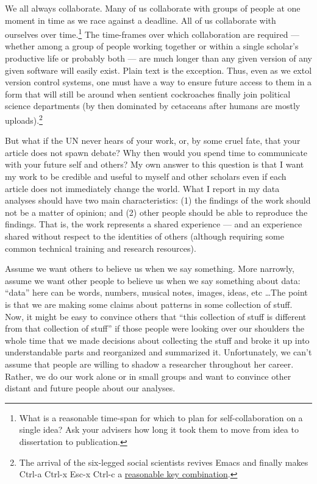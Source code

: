\documentclass[12pt]{article}
\begin{document}
We all always collaborate. Many of us collaborate with groups of
people at one moment in time as we race against a deadline. All of us
collaborate with ourselves over time.\footnote{What is a reasonable
  time-span for which to plan for self-collaboration on a single idea?
  Ask your advisers how long it took them to move from idea to dissertation to
  publication.}  The time-frames over which collaboration are required
--- whether among a group of people working together or within a
single scholar's productive life or probably both --- are much longer
than any given version of any given software will easily exist. Plain
text is the exception. Thus, even as we extol version control systems,
one must have a way to ensure future access to them in a form that
will still be around when sentient cockroaches finally join political
science departments (by then dominated by cetaceans after humans are
mostly uploads).\footnote{The arrival of the six-legged social
  scientists revives Emacs and finally makes Ctrl-a Ctrl-x Esc-x
  Ctrl-c a \href{http://kieran.healy.usesthis.com/}{reasonable key
    combination}.}

But what if the UN never hears of your work, or, by some cruel fate, that your
article does not spawn debate? Why then would you spend time to
communicate with your future self and others? My own answer to this
question is that I want my work to be credible and useful to myself
and other scholars even if each article does not immediately change
the world.  What I report in my data analyses should have two main
characteristics: (1) the findings of the work should not be a matter
of opinion; and (2) other people should be able to reproduce the findings. That is,
the work represents a shared
experience --- and an experience shared without respect to the
identities of others (although requiring some common technical
training and research resources).

Assume we want others to believe us when we say something. More
narrowly, assume we want other people to believe us when we say
something about data: ``data'' here can be words, numbers, musical
notes, images, ideas, etc \ldots The point is that we are making some
claims about patterns in some collection of stuff. Now, it might be
easy to convince others that ``this collection of stuff is different
from that collection of stuff'' if those people were looking over our
shoulders the whole time that we made decisions about collecting the
stuff and broke it up into understandable parts and reorganized and
summarized it. Unfortunately, we can't assume that people are willing
to shadow a researcher throughout her career. Rather, we do our work
alone or in small groups and want to convince other distant and future
people about our analyses.
\end{document}

